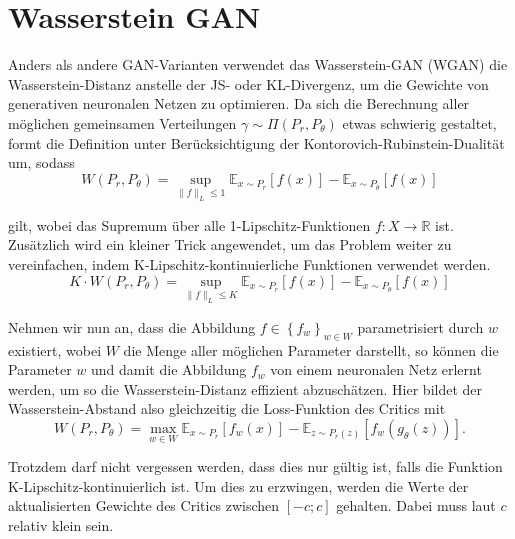 \documentclass{hsflensburg}
\begin{document}
  \section{Wasserstein GAN}
  Anders als andere GAN-Varianten verwendet das Wasserstein-GAN (WGAN) die
  Was\-ser\-stein-Distanz anstelle der JS- oder KL-Divergenz, um die Gewichte
  von generativen neuronalen Netzen zu optimieren. Da sich die Berechnung aller
  möglichen gemeinsamen Verteilungen $\gamma \sim \Pi(P_r, P_\theta)$ etwas schwierig
  gestaltet, formt \cite{arjovsky2017wasserstein} die Definition unter
  Berücksichtigung der Kontorovich-Rubinstein-Dualität um, sodass
  \[
    W(P_r, P_\theta) = \sup_{\|f\|_L \leq 1} \mathbb{E}_{x \sim P_r}\left[f(x)\right] - \mathbb{E}_{x \sim P_\theta}\left[f(x)\right]
  \]

  gilt, wobei das Supremum über alle 1-Lipschitz-Funktionen $f : X \to
  \mathbb{R}$ ist. Zusätzlich wird ein kleiner Trick angewendet, um das Problem
  weiter zu vereinfachen, indem K-Lipschitz-kontinuierliche Funktionen verwendet
  werden.
  \[
    K \cdot W(P_r, P_\theta) = \sup_{\|f\|_L \leq K} \mathbb{E}_{x \sim P_r}\left[f(x)\right] - \mathbb{E}_{x \sim P_\theta}\left[f(x)\right]
  \]

  Nehmen wir nun an, dass die Abbildung $f \in \left\{f_w\right\}_{w \in W}$
  parametrisiert durch $w$ existiert, wobei $W$ die Menge aller möglichen
  Parameter darstellt, so können die Parameter $w$ und damit die Abbildung $f_w$
  von einem neuronalen Netz erlernt werden, um so die Wasserstein-Distanz
  effizient abzuschätzen. Hier bildet der Wasserstein-Abstand also gleichzeitig
  die Loss-Funktion des Critics mit
  \[
    W(P_r, P_\theta) = \max_{w \in W} \mathbb{E}_{x \sim P_r}\left[f_w(x)\right]
    - \mathbb{E}_{z \sim P_r(z)}\left[f_w(g_\theta(z))\right].
  \]

  Trotzdem darf nicht vergessen werden, dass dies nur gültig ist, falls die
  Funktion K-Lipschitz-kontinuierlich ist. Um dies zu erzwingen, werden die
  Werte der aktualisierten Gewichte des Critics zwischen $\left[-c; c\right]$
  gehalten. Dabei muss laut \cite{arjovsky2017wasserstein} $c$ relativ klein
  sein.
\end{document}
